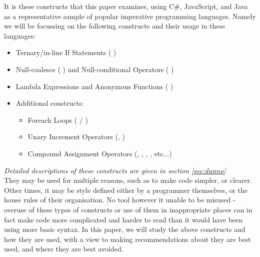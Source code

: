 \documentclass{article}
\begin{document}
        It is these constructs that this paper examines, using C\#, JavaScript, and Java as a representative sample of popular imperative programming languages. Namely we will be focussing on the following constructs and their usage in these languages:
        
        \begin{itemize}
            \item Ternary/in-line If Statements (  )
            \item Null-coalesce (  ) and Null-conditional Operators (  )
            \item Lambda Expressions and Anonymous Functions (  )
            \item Additional constructs:
            \begin{itemize}
                \item Foreach Loops (  / )
                \item Unary Increment Operators (, )
                \item Compound Assignment Operators (,  , , , etc...)
            \end{itemize}
        \end{itemize}
        
        \emph{Detailed descriptions of these constructs are given in section \ref{sec:dunno}}\\

        They may be used for multiple reasons, such as to make code simpler, or clearer. Other times, it may be style defined either by a programmer themselves, or the house rules of their organisation. No tool however it unable to be misused - overuse of these types of constructs or use of them in inappropriate places can in fact make code more complicated and harder to read than it would have been using more basic syntax. In this paper, we will study the above constructs and how they are used, with a view to making recommendations about they are best used, and where they are best avoided.
\end{document}
